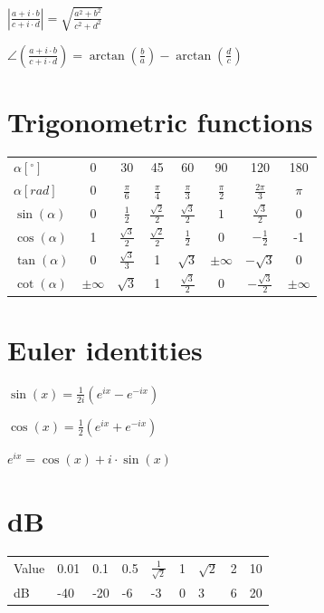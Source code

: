 \documentclass[10pt,a4paper]{scrartcl}
\begin{document}
\begin{multicols*}{3}
\begin{center}
	$\left|\frac{a+i\cdot b}{c+i\cdot d}\right|=\sqrt{\frac{a^2+b^2}{c^2+d^2}}$

	\finn
	
	$\angle\left(\frac{a+i\cdot b}{c+i\cdot d}\right)=\arctan\left(\frac{b}{a}\right)-\arctan\left(\frac{d}{c}\right)$
	\end{center}
	
	\section{Trigonometric functions}
	
	\begin{center}
	\begin{tabular}{lccccccc}
	\hline
	\hline
	$\alpha[^\circ]$&0&30&45&60&90&120&180\\
	$\alpha[rad]$&0&$\frac{\pi}{6}$&$\frac{\pi}{4}$&$\frac{\pi}{3}$&$\frac{\pi}{2}$&$\frac{2\pi}{3}$&$\pi$\\
	\hline
	$\sin(\alpha)$&0&$\frac{1}{2}$&$\frac{\sqrt{2}}{2}$&$\frac{\sqrt{3}}{2}$&$1$&$\frac{\sqrt{3}}{2}$&0\\
	$\cos(\alpha)$&1&$\frac{\sqrt{3}}{2}$&$\frac{\sqrt{2}}{2}$&$\frac{1}{2}$&0&$-\frac{1}{2}$&-1\\
	$\tan(\alpha)$&0&$\frac{\sqrt{3}}{3}$&1&$\sqrt{3}$&$\pm\infty$&$-\sqrt{3}$&0\\
	$\cot(\alpha)$&$\pm\infty$&$\sqrt{3}$&1&$\frac{\sqrt{3}}{2}$&0&$-\frac{\sqrt{3}}{2}$&$\pm\infty$\\
	\hline
	\hline
	\end{tabular}
	\end{center}
	
	\section{Euler identities}
	
	\begin{center}
	$\sin(x)=\frac{1}{2i}(e^{ix}-e^{-ix})$
	
	\finn
	
	$\cos(x)=\frac{1}{2}(e^{ix}+e^{-ix})$
	
	\finn
	
	$e^{ix}=\cos(x)+i\cdot\sin(x)$
	
	\section{dB}
	
	\begin{tabular}{l|llllllll}
	\hline
	Value&0.01&0.1&0.5&$\frac{1}{\sqrt{2}}$&1&$\sqrt{2}$&2&10\\
	dB&-40&-20&-6&-3&0&3&6&20\\
	\hline
	\end{tabular}
	

\end{center}
\end{multicols*}
\end{document}
